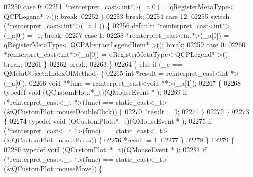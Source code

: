 \begin{DoxyCode}
02250             \textcolor{keywordflow}{case} 0:
02251                 *\textcolor{keyword}{reinterpret\_cast<}\textcolor{keywordtype}{int}*\textcolor{keyword}{>}(\_a[0]) = qRegisterMetaType< QCPLegend* >(); \textcolor{keywordflow}{break};
02252             \}
02253             \textcolor{keywordflow}{break};
02254         \textcolor{keywordflow}{case} 12:
02255             \textcolor{keywordflow}{switch} (*reinterpret\_cast<int*>(\_a[1])) \{
02256             \textcolor{keywordflow}{default}: *\textcolor{keyword}{reinterpret\_cast<}\textcolor{keywordtype}{int}*\textcolor{keyword}{>}(\_a[0]) = -1; \textcolor{keywordflow}{break};
02257             \textcolor{keywordflow}{case} 1:
02258                 *\textcolor{keyword}{reinterpret\_cast<}\textcolor{keywordtype}{int}*\textcolor{keyword}{>}(\_a[0]) = qRegisterMetaType< QCPAbstractLegendItem* >(); \textcolor{keywordflow}{break};
02259             \textcolor{keywordflow}{case} 0:
02260                 *\textcolor{keyword}{reinterpret\_cast<}\textcolor{keywordtype}{int}*\textcolor{keyword}{>}(\_a[0]) = qRegisterMetaType< QCPLegend* >(); \textcolor{keywordflow}{break};
02261             \}
02262             \textcolor{keywordflow}{break};
02263         \}
02264     \} \textcolor{keywordflow}{else} \textcolor{keywordflow}{if} (\_c == QMetaObject::IndexOfMethod) \{
02265         \textcolor{keywordtype}{int} *result = \textcolor{keyword}{reinterpret\_cast<}\textcolor{keywordtype}{int} *\textcolor{keyword}{>}(\_a[0]);
02266         \textcolor{keywordtype}{void} **func = \textcolor{keyword}{reinterpret\_cast<}\textcolor{keywordtype}{void} **\textcolor{keyword}{>}(\_a[1]);
02267         \{
02268             \textcolor{keyword}{typedef} void (QCustomPlot::*\_t)(QMouseEvent * );
02269             \textcolor{keywordflow}{if} (*reinterpret\_cast<\_t *>(func) == \textcolor{keyword}{static\_cast<}\_t\textcolor{keyword}{>}(&QCustomPlot::mouseDoubleClick)) \{
02270                 *result = 0;
02271             \}
02272         \}
02273         \{
02274             \textcolor{keyword}{typedef} void (QCustomPlot::*\_t)(QMouseEvent * );
02275             \textcolor{keywordflow}{if} (*reinterpret\_cast<\_t *>(func) == \textcolor{keyword}{static\_cast<}\_t\textcolor{keyword}{>}(&QCustomPlot::mousePress)) \{
02276                 *result = 1;
02277             \}
02278         \}
02279         \{
02280             \textcolor{keyword}{typedef} void (QCustomPlot::*\_t)(QMouseEvent * );
02281             \textcolor{keywordflow}{if} (*reinterpret\_cast<\_t *>(func) == \textcolor{keyword}{static\_cast<}\_t\textcolor{keyword}{>}(&QCustomPlot::mouseMove)) \{

\end{DoxyCode}
